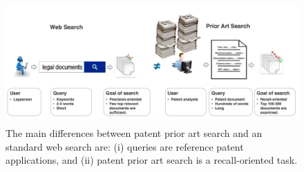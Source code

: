 
\begin{figure}[htpb]
   \centering
   \includegraphics[width=\textwidth,height=47mm]{figs/webprior.png}
   \caption{The main differences between patent prior art search and an standard web search are: (i) queries are reference patent
applications, and (ii) patent prior art search is a recall-oriented task.}  
   \label{fig:compareappr} 
\end{figure}
\FloatBarrier
